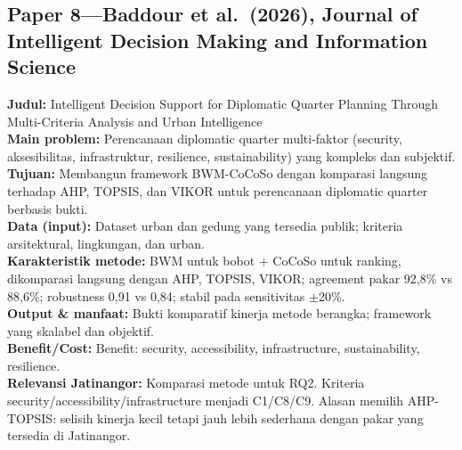 \documentclass[a4paper,11pt]{article}
\begin{document}
\subsection*{Paper 8---Baddour et al.\ (2026), Journal of Intelligent Decision Making and Information Science}
\textbf{Judul:} Intelligent Decision Support for Diplomatic Quarter Planning Through Multi-Criteria Analysis and Urban Intelligence\\
\textbf{Main problem:} Perencanaan diplomatic quarter multi-faktor (security, aksesibilitas, infrastruktur, resilience, sustainability) yang kompleks dan subjektif.\\
\textbf{Tujuan:} Membangun framework BWM-CoCoSo dengan komparasi langsung terhadap AHP, TOPSIS, dan VIKOR untuk perencanaan diplomatic quarter berbasis bukti.\\
\textbf{Data (input):} Dataset urban dan gedung yang tersedia publik; kriteria arsitektural, lingkungan, dan urban.\\
\textbf{Karakteristik metode:} BWM untuk bobot + CoCoSo untuk ranking, dikomparasi langsung dengan AHP, TOPSIS, VIKOR; agreement pakar 92,8\% vs 88,6\%; robustness 0,91 vs 0,84; stabil pada sensitivitas $\pm$20\%.\\
\textbf{Output \& manfaat:} Bukti komparatif kinerja metode berangka; framework yang skalabel dan objektif.\\
\textbf{Benefit/Cost:} Benefit: security, accessibility, infrastructure, sustainability, resilience.\\
\textbf{Relevansi Jatinangor:} Komparasi metode untuk RQ2. Kriteria security/accessibility/infrastructure menjadi C1/C8/C9. Alasan memilih AHP-TOPSIS: selisih kinerja kecil tetapi jauh lebih sederhana dengan pakar yang tersedia di Jatinangor.
\end{document}
